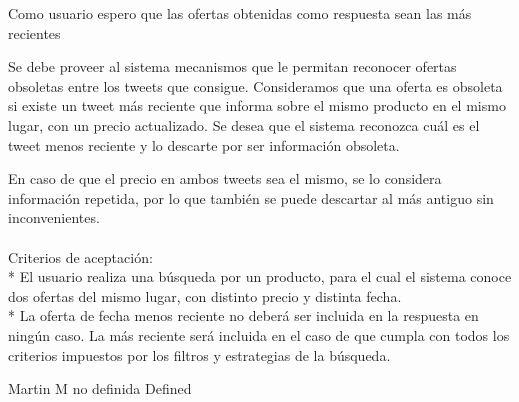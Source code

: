 	{Como usuario espero que las ofertas obtenidas como respuesta sean las más recientes} %
	{Se debe proveer al sistema mecanismos que le permitan reconocer ofertas
obsoletas entre los tweets que consigue. Consideramos que una oferta es
obsoleta si existe un tweet más reciente que informa sobre el mismo producto
en el mismo lugar, con un precio actualizado. Se desea que el sistema
reconozca cuál es el tweet menos reciente y lo descarte por ser información
obsoleta.

En caso de que el precio en ambos tweets sea el mismo, se lo considera
información repetida, por lo que también se puede descartar al más antiguo sin
inconvenientes.\\
  \\
Criterios de aceptación:\\
* El usuario realiza una búsqueda por un producto, para el cual el sistema conoce dos ofertas del mismo lugar, con distinto precio y distinta fecha.  \\
* La oferta de fecha menos reciente no deberá ser incluida en la respuesta en ningún caso. La más reciente será incluida en el caso de que cumpla con todos los criterios impuestos por los filtros y estrategias de la búsqueda.\\
} %
	{} %
	{} %
	{Martin M} %
	{no definida} %
	{Defined} %


\vspace{20pt}

